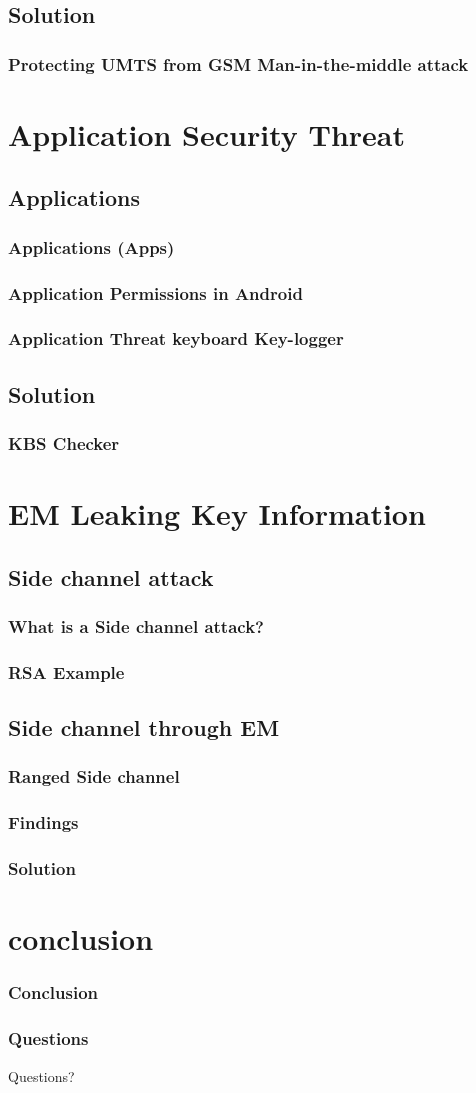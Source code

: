 \documentclass{beamer}
\begin{document}
\subsection{Solution}
\begin{frame}
\frametitle{Protecting UMTS from GSM Man-in-the-middle attack}
\end{frame}
\section{Application Security Threat}
	\subsection{Applications}
		\begin{frame}
		\frametitle{Applications (Apps)}
		\end{frame}
		\begin{frame}
		\frametitle{Application Permissions in Android}
		\end{frame}
		\begin{frame}
		\frametitle{Application Threat keyboard Key-logger}
		\end{frame}
	\subsection{Solution}
		\begin{frame}
		\frametitle{KBS Checker}
		\end{frame}
\section{EM Leaking Key Information}
	\subsection{Side channel attack}
		\begin{frame}
		\frametitle{What is a Side channel attack?}
		\end{frame}
		\begin{frame}
		\frametitle{RSA Example}
		\end{frame}
	\subsection{Side channel through EM }
		\begin{frame}
		\frametitle{Ranged Side channel}
		\end{frame}
		
		\begin{frame}
		\frametitle{Findings}
		\end{frame}
		
		\begin{frame}
		\frametitle{Solution}
		\end{frame}
\section{conclusion}
	\begin{frame}
		\frametitle{Conclusion}
		\end{frame}	
		
		\begin{frame}
		\frametitle{Questions}
			\begin{center}
			\Huge Questions?
			\end{center}
		\end{frame}	
\end{document}
